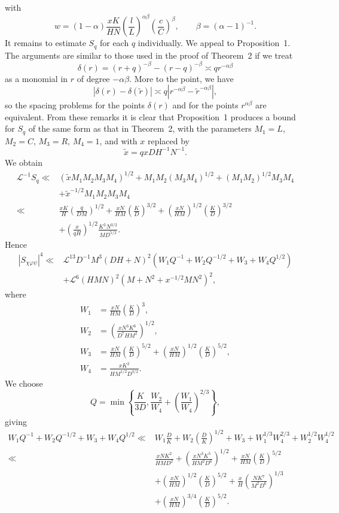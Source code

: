 \documentclass[10pt]{article}
\begin{document}
with
\[
 w=(1-\alpha)\frac{xK}{HN}
   \left(\frac lL\right)^{\alpha\beta}
   \left(\frac cC\right)^\beta,
 \qquad \beta=(\alpha-1)^{-1}.
\]
It remains to estimate $S_q$ for each $q$ individually. We appeal to
Proposition~1. The arguments are similar to those used in the proof of
Theorem~2 if we treat
\[
 \delta(r)=(r+q)^{-\beta}-(r-q)^{-\beta}\asymp q r^{-\alpha\beta}
\]
as a monomial in $r$ of degree $-\alpha\beta$. More to the point, we have
\[
 |\delta(r)-\delta(\widetilde r)|
 \asymp q\left|r^{-\alpha\beta}-\widetilde r^{-\alpha\beta}\right|,
\]
so the spacing problems for the points $\delta(r)$ and for the points
$r^{\alpha\beta}$ are equivalent. From these remarks it is clear that
Proposition~1 produces a bound for $S_q$ of the same form as that in
Theorem~2, with the parameters $M_1=L$, $M_2=C$, $M_3=R$, $M_4=1$, and
with $x$ replaced by
\[
 \widetilde x=qxDH^{-1}N^{-1}.
\]
We obtain
\[
\begin{aligned}
\mathscr L^{-1}S_q\ll{}&
 (\widetilde xM_1M_2M_3M_4)^{1/2}
 +M_1M_2(M_3M_4)^{1/2}
 +(M_1M_2)^{1/2}M_3M_4\\
&+\widetilde x^{-1/2}M_1M_2M_3M_4\\
\ll{}&\frac{xK}{H}\left(\frac{q}{DM}\right)^{1/2}
 +\frac{xN}{HM}\left(\frac KD\right)^{3/2}
 +\left(\frac{xN}{HM}\right)^{1/2}\left(\frac KD\right)^{3/2}\\
&+\left(\frac{x}{qH}\right)^{1/2}
  \frac{K^2N^{3/2}}{MD^{5/2}}.
\end{aligned}
\]
Hence
\[
\begin{aligned}
|S_{\chi\varphi\psi}|^4\ll{}&\mathscr L^{13}D^{-1}M^3(DH+N)^2
 \left(W_1Q^{-1}+W_2Q^{-1/2}+W_3+W_4Q^{1/2}\right)\\
&+\mathscr L^6(HMN)^2\left(M+N^2+x^{-1/2}MN^2\right)^2,
\end{aligned}
\]
where
\[
\begin{aligned}
W_1&=\frac{xN}{HM}\left(\frac KD\right)^3,\\
W_2&=\left(\frac{xN^3K^6}{D^7HM^2}\right)^{1/2},\\
W_3&=\frac{xN}{HM}\left(\frac KD\right)^{5/2}
 +\left(\frac{xN}{HM}\right)^{1/2}\left(\frac KD\right)^{5/2},\\
W_4&=\frac{xK^2}{HM^{1/2}D^{3/2}}.
\end{aligned}
\]
We choose
\[
 Q=\min\left\{\frac{K}{3D},\frac{W_2}{W_4}
       +\left(\frac{W_1}{W_4}\right)^{2/3}\right\},
\]
giving
\[
\begin{aligned}
W_1Q^{-1}+W_2Q^{-1/2}+W_3+W_4Q^{1/2}
\ll{}&W_1\frac DK+W_2\left(\frac DK\right)^{1/2}+W_3
 +W_1^{1/3}W_4^{2/3}+W_2^{1/2}W_4^{1/2}\\
\ll{}&\frac{xNK^2}{HMD^2}
 +\left(\frac{xN^3K^5}{HM^2D^6}\right)^{1/2}
 +\frac{xN}{HM}\left(\frac KD\right)^{5/2}\\
&+\left(\frac{xN}{HM}\right)^{1/2}\left(\frac KD\right)^{5/2}
 +\frac{x}{H}\left(\frac{NK^7}{M^2D^6}\right)^{1/3}\\
&+\left(\frac{xN}{HM}\right)^{3/4}\left(\frac KD\right)^{5/2}.
\end{aligned}
\]
\end{document}
